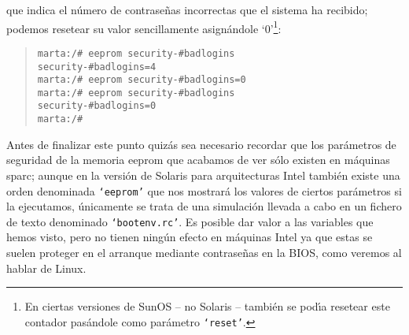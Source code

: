 que indica el n\'umero de contrase\~nas incorrectas que el sistema ha recibido; 
podemos resetear su valor sencillamente asign\'andole `0'\footnote{En ciertas
versiones de SunOS -- no Solaris -- tambi\'en se pod\'{\i}a resetear este 
contador pas\'andole como par\'ametro {\tt `reset'}.}:
\begin{quote}
\begin{verbatim}
marta:/# eeprom security-#badlogins
security-#badlogins=4
marta:/# eeprom security-#badlogins=0
marta:/# eeprom security-#badlogins
security-#badlogins=0
marta:/# 
\end{verbatim}
\end{quote}
Antes de finalizar este punto quiz\'as sea necesario recordar que los 
par\'ametros de seguridad de la memoria {\sc eeprom} que acabamos de ver s\'olo
existen en m\'aquinas {\sc sparc}; aunque en la versi\'on de Solaris para
arquitecturas Intel tambi\'en existe una orden denominada {\tt `eeprom'} que nos
mostrar\'a los valores de ciertos par\'ametros si la ejecutamos, \'unicamente
se trata de una simulaci\'on llevada a cabo en un fichero de texto denominado
{\tt `bootenv.rc'}. Es posible dar valor a las variables que hemos visto, pero
no tienen ning\'un efecto en m\'aquinas Intel ya que estas se suelen proteger
en el arranque mediante contrase\~nas en la BIOS, como veremos al hablar de
Linux.
